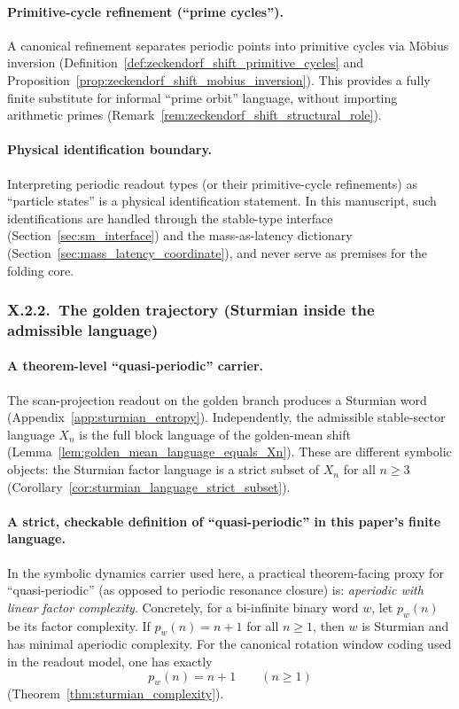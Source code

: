\paragraph{Primitive-cycle refinement (``prime cycles'').}
\MathTag A canonical refinement separates periodic points into primitive cycles via M\"obius inversion (Definition~\ref{def:zeckendorf_shift_primitive_cycles} and Proposition~\ref{prop:zeckendorf_shift_mobius_inversion}).
This provides a fully finite substitute for informal ``prime orbit'' language, without importing arithmetic primes (Remark~\ref{rem:zeckendorf_shift_structural_role}).

\paragraph{Physical identification boundary.}
\InterfaceTag Interpreting periodic readout types (or their primitive-cycle refinements) as ``particle states'' is a physical identification statement.
In this manuscript, such identifications are handled through the stable-type interface (Section~\ref{sec:sm_interface}) and the mass-as-latency dictionary (Section~\ref{sec:mass_latency_coordinate}), and never serve as premises for the folding core.

\subsubsection{X.2.2.\ The golden trajectory (Sturmian inside the admissible language)}
\label{subsubsec:x22_golden_trajectory_sturmian}

\paragraph{A theorem-level ``quasi-periodic'' carrier.}
\MathTag The scan-projection readout on the golden branch produces a Sturmian word (Appendix~\ref{app:sturmian_entropy}).
Independently, the admissible stable-sector language $X_n$ is the full block language of the golden-mean shift (Lemma~\ref{lem:golden_mean_language_equals_Xn}).
These are different symbolic objects: the Sturmian factor language is a strict subset of $X_n$ for all $n\ge 3$ (Corollary~\ref{cor:sturmian_language_strict_subset}).

\paragraph{A strict, checkable definition of ``quasi-periodic'' in this paper's finite language.}
\MathTag In the symbolic dynamics carrier used here, a practical theorem-facing proxy for ``quasi-periodic'' (as opposed to periodic resonance closure) is:
\emph{aperiodic with linear factor complexity}.
Concretely, for a bi-infinite binary word $w$, let $p_w(n)$ be its factor complexity.
If $p_w(n)=n+1$ for all $n\ge 1$, then $w$ is Sturmian and has minimal aperiodic complexity.
For the canonical rotation window coding used in the readout model, one has exactly
\[
p_w(n)=n+1\qquad (n\ge 1)
\]
(Theorem~\ref{thm:sturmian_complexity}).

